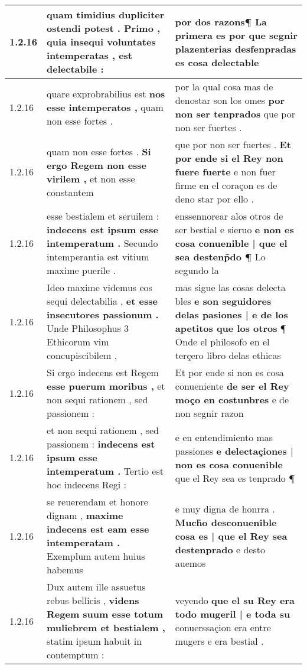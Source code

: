 \begin{tabular}{|p{1cm}|p{6.5cm}|p{6.5cm}|}
1.2.16 & quam timidius dupliciter ostendi potest . \textbf{ Primo , quia insequi voluntates intemperatas , } est delectabile : & por dos razons¶ \textbf{ La primera es por que segnir } plazenterias desfenpradas es cosa delectable \\\hline
1.2.16 & quare exprobrabilius est \textbf{ nos esse intemperatos , } quam non esse fortes . & por la qual cosa mas de denostar son los omes \textbf{ por non ser tenprados } que por non ser fuertes . \\\hline
1.2.16 & quam non esse fortes . \textbf{ Si ergo Regem non esse virilem , } et non esse constantem & que por non ser fuertes . \textbf{ Et por ende si el Rey non fuere fuerte } e non fuer firme en el coraçon es de deno star por ello . \\\hline
1.2.16 & esse bestialem et seruilem : \textbf{ indecens est ipsum esse intemperatum . } Secundo intemperantia est vitium maxime puerile . & enssennorear alos otros de ser bestial e sieruo \textbf{ e non es cosa conuenible | que el sea destenp̃do ¶ } Lo segundo la \\\hline
1.2.16 & Ideo maxime videmus eos sequi delectabilia , \textbf{ et esse insecutores passionum . } Unde Philosophus 3 Ethicorum vim concupiscibilem , & mas sigue las cosas delecta bles \textbf{ e son seguidores delas pasiones | e de los apetitos que los otros } ¶ Onde el philosofo en el terçero libro delas ethicas \\\hline
1.2.16 & Si ergo indecens est Regem \textbf{ esse puerum moribus , } et non sequi rationem , sed passionem : & Et por ende si non es cosa conueniente \textbf{ de ser el Rey moço en costunbres } e de non segnir razon \\\hline
1.2.16 & et non sequi rationem , sed passionem : \textbf{ indecens est ipsum esse intemperatum . } Tertio est hoc indecens Regi : & e en entendimiento mas passiones \textbf{ e delectaçiones | non es cosa conuenible } que el Rey sea es tenprado ¶ \\\hline
1.2.16 & se reuerendam et honore dignam , \textbf{ maxime indecens est eam esse intemperatam . } Exemplum autem huius habemus & e muy digna de honrra . \textbf{ Much̃o desconuenible cosa es | que el Rey sea destenprado } e desto auemos \\\hline
1.2.16 & Dux autem ille assuetus rebus bellicis , \textbf{ videns Regem suum esse totum muliebrem et bestialem , } statim ipsum habuit in contemptum : & veyendo \textbf{ que el su Rey era todo mugeril | e toda su } conuerssaçion era entre mugers e era bestial . \\\hline

\end{tabular}
